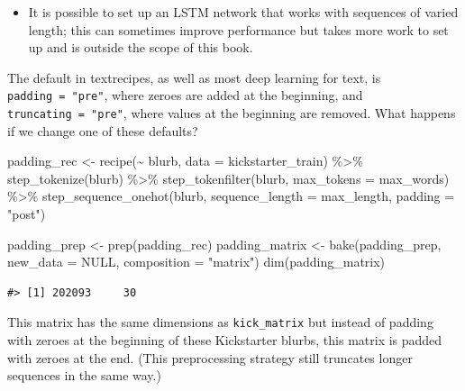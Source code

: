 \documentclass[
]{krantz}
\makeatletter
\newenvironment{Shaded}{\begin{snugshade}}{\end{snugshade}}
\newcommand{\AttributeTok}[1]{\textcolor[rgb]{0.77,0.63,0.00}{#1}}
\newcommand{\ConstantTok}[1]{\textcolor[rgb]{0.00,0.00,0.00}{#1}}
\newcommand{\DecValTok}[1]{\textcolor[rgb]{0.00,0.00,0.81}{#1}}
\newcommand{\FunctionTok}[1]{\textcolor[rgb]{0.00,0.00,0.00}{#1}}
\newcommand{\NormalTok}[1]{#1}
\newcommand{\OtherTok}[1]{\textcolor[rgb]{0.56,0.35,0.01}{#1}}
\newcommand{\SpecialCharTok}[1]{\textcolor[rgb]{0.00,0.00,0.00}{#1}}
\newcommand{\StringTok}[1]{\textcolor[rgb]{0.31,0.60,0.02}{#1}}
\newenvironment{kframe}{%
\medskip{}
\setlength{\fboxsep}{.8em}
 \def\at@end@of@kframe{}%
 \ifinner\ifhmode%
  \def\at@end@of@kframe{\end{minipage}}%
  \begin{minipage}{\columnwidth}%
 \fi\fi%
 \def\FrameCommand##1{\hskip\@totalleftmargin \hskip-\fboxsep
 \colorbox{shadecolor}{##1}\hskip-\fboxsep
     \hskip-\linewidth \hskip-\@totalleftmargin \hskip\columnwidth}%
 \MakeFramed {\advance\hsize-\width
   \@totalleftmargin\z@ \linewidth\hsize
   \@setminipage}}%
 {\par\unskip\endMakeFramed%
 \at@end@of@kframe}
\renewenvironment{Shaded}{\begin{kframe}}{\end{kframe}}
\newenvironment{rmdblock}[1]
  {\begin{shaded*}
  \begin{itemize}[left = -1cm, labelsep = 1cm]
  \renewcommand{\labelitemi}{
    \raisebox{-.7\height}[0pt][0pt]{
      {\setkeys{Gin}{width=3em,keepaspectratio}\texttt{[image: images/\#1]}}
    }
  }
 
  \item
  }
  {
  \end{itemize}
  \end{shaded*}
  }
\newenvironment{rmdnote}
  {\begin{rmdblock}{note}}
  {\end{rmdblock}}
\makeatother
\begin{document}
\begin{rmdnote}
It is possible to set up an LSTM network that works with sequences of
varied length; this can sometimes improve performance but takes more
work to set up and is outside the scope of this book.
\end{rmdnote}

The default in textrecipes, as well as most deep learning for text, is \texttt{padding\ =\ "pre"}, where zeroes are added at the beginning, and \texttt{truncating\ =\ "pre"}, where values at the beginning are removed. What happens if we change one of these defaults?

\begin{Shaded}
\begin{Highlighting}[]
\NormalTok{padding\_rec }\OtherTok{\textless{}{-}} \FunctionTok{recipe}\NormalTok{(}\SpecialCharTok{\textasciitilde{}}\NormalTok{ blurb, }\AttributeTok{data =}\NormalTok{ kickstarter\_train) }\SpecialCharTok{\%\textgreater{}\%}
  \FunctionTok{step\_tokenize}\NormalTok{(blurb) }\SpecialCharTok{\%\textgreater{}\%}
  \FunctionTok{step\_tokenfilter}\NormalTok{(blurb, }\AttributeTok{max\_tokens =}\NormalTok{ max\_words) }\SpecialCharTok{\%\textgreater{}\%}
  \FunctionTok{step\_sequence\_onehot}\NormalTok{(blurb, }\AttributeTok{sequence\_length =}\NormalTok{ max\_length, }\AttributeTok{padding =} \StringTok{"post"}\NormalTok{)}

\NormalTok{padding\_prep }\OtherTok{\textless{}{-}} \FunctionTok{prep}\NormalTok{(padding\_rec)}
\NormalTok{padding\_matrix }\OtherTok{\textless{}{-}} \FunctionTok{bake}\NormalTok{(padding\_prep, }\AttributeTok{new\_data =} \ConstantTok{NULL}\NormalTok{, }\AttributeTok{composition =} \StringTok{"matrix"}\NormalTok{)}
\FunctionTok{dim}\NormalTok{(padding\_matrix)}
\end{Highlighting}
\end{Shaded}

\begin{verbatim}
#> [1] 202093     30
\end{verbatim}

This matrix has the same dimensions as \texttt{kick\_matrix} but instead of padding with zeroes at the beginning of these Kickstarter blurbs, this matrix is padded with zeroes at the end. (This preprocessing strategy still truncates longer sequences in the same way.)

\begin{Shaded}
\end{Shaded}
\end{document}
